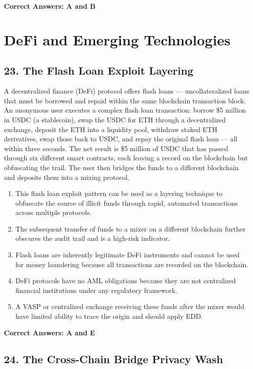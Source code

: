 \documentclass[11pt,a4paper]{article}
\begin{document}
	\textbf{Correct Answers: A and B}
	
	\section{DeFi and Emerging Technologies}
	
	\subsection{23. The Flash Loan Exploit Layering}
	
	A decentralized finance (DeFi) protocol offers flash loans — uncollateralized loans that must be borrowed and repaid within the same blockchain transaction block. An anonymous user executes a complex flash loan transaction: borrow \$5 million in USDC (a stablecoin), swap the USDC for ETH through a decentralized exchange, deposit the ETH into a liquidity pool, withdraw staked ETH derivatives, swap those back to USDC, and repay the original flash loan — all within three seconds. The net result is \$5 million of USDC that has passed through six different smart contracts, each leaving a record on the blockchain but obfuscating the trail. The user then bridges the funds to a different blockchain and deposits them into a mixing protocol.
	
	\begin{enumerate}[label=\Alph*.]
		\item This flash loan exploit pattern can be used as a layering technique to obfuscate the source of illicit funds through rapid, automated transactions across multiple protocols.
		\item The subsequent transfer of funds to a mixer on a different blockchain further obscures the audit trail and is a high-risk indicator.
		\item Flash loans are inherently legitimate DeFi instruments and cannot be used for money laundering because all transactions are recorded on the blockchain.
		\item DeFi protocols have no AML obligations because they are not centralized financial institutions under any regulatory framework.
		\item A VASP or centralized exchange receiving these funds after the mixer would have limited ability to trace the origin and should apply EDD.
	\end{enumerate}
	
	\textbf{Correct Answers: A and E}
	
	\subsection{24. The Cross-Chain Bridge Privacy Wash}
	
\end{document}
